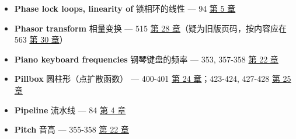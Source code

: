 \begin{itemize}
  \begin{itemize}
  \tightlist
  \item
    另见 \textbf{Polar notation}（极坐标表示法）
  \item
    carries edge information：携带边缘信息 --- 191-192 
    \hyperref[ch-10]{第 10 章}；222-224  \hyperref[ch-11]{第
    11 章}
  \item
    hearing, insensitivity to：听觉对它不敏感 --- 355-356 
    \hyperref[ch-22]{第 22 章}
  \item
    linear phase：线性相位 --- 131-132  \hyperref[ch-07]{第 7
    章}；188-191  \hyperref[ch-10]{第 10 章}；328-332
     \hyperref[ch-19]{第 19 章}
  \item
    nonlinear phase：非线性相位 --- 131-132 
    \hyperref[ch-07]{第 7 章}；328-332  \hyperref[ch-19]{第 19
    章}
  \item
    nuisances and ambiguities：麻烦与多值性 --- 164-168 
    \hyperref[ch-08]{第 8 章}
  \item
    time domain shifting, effect on：时域平移对它的影响 --- 188-191
     \hyperref[ch-10]{第 10 章}
  \item
    unwrapping：展开 --- 167  \hyperref[ch-08]{第 8
    章}；188-189  \hyperref[ch-10]{第 10 章}
  \item
    zero phase：零相位 --- 131-132  \hyperref[ch-07]{第 7
    章}；188-191  \hyperref[ch-10]{第 10 章}；328-332
     \hyperref[ch-19]{第 19 章}
  \end{itemize}
\item
  \textbf{Phase lock loops, linearity of} 锁相环的线性 --- 94 
  \hyperref[ch-05]{第 5 章}
\item
  \textbf{Phasor transform} 相量变换 --- 515 
  \hyperref[ch-28]{第 28 章}（疑为旧版页码，按内容应在 563 
  \hyperref[ch-30]{第 30 章}）
\item
  \textbf{Piano keyboard frequencies} 钢琴键盘的频率 --- 353, 357-358
   \hyperref[ch-22]{第 22 章}
\item
  \textbf{Pillbox} 圆柱形（点扩散函数） --- 400-401 
  \hyperref[ch-24]{第 24 章}；423-424, 427-428 
  \hyperref[ch-25]{第 25 章}
\item
  \textbf{Pipeline} 流水线 --- 84  \hyperref[ch-04]{第 4 章}
\item
  \textbf{Pitch} 音高 --- 355-358  \hyperref[ch-22]{第 22 章}

\end{itemize}
